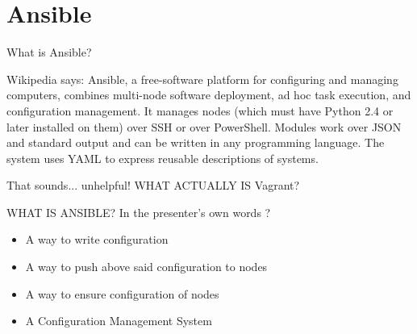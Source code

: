 \documentclass{beamer}
\begin{document}
\section{Ansible}
    \begin{frame}{What is Ansible?}
    \pause \begin{block}{Wikipedia says:}
	    Ansible, a free-software platform for configuring and managing computers, combines multi-node software deployment,
	    ad hoc task execution, and configuration management. It manages nodes (which must have Python 2.4 or later installed on them)
	    over SSH or over PowerShell. Modules work over JSON and standard output and can be written in any programming language.
	    The system uses YAML to express reusable descriptions of systems.
    \end{block}
    \pause That sounds... unhelpful! WHAT ACTUALLY IS Vagrant?
    \end{frame}

    \begin{frame}{WHAT IS ANSIBLE?}
	    In the presenter's own words ?
        \begin{itemize}
	    \pause \item A way to write configuration
	    \pause \item A way to push above said configuration to nodes
	    \pause \item A way to ensure configuration of nodes
	    \pause \item A Configuration Management System
        \end{itemize}
    \end{frame}

%        
\end{document}
